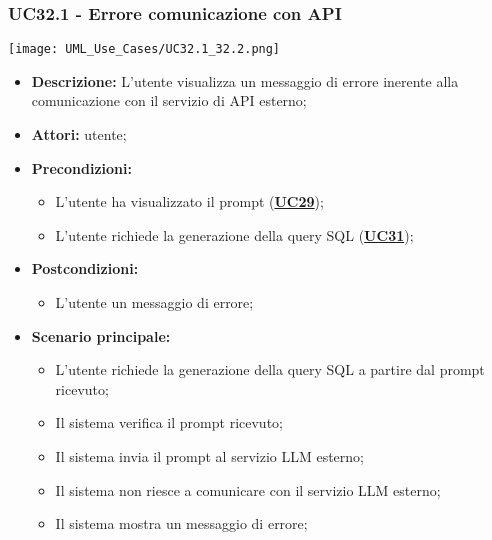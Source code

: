 \subsubsection{UC32.1 - Errore comunicazione con API}
\label{sec:UC32.1}
\texttt{[image: UML\_Use\_Cases/UC32.1\_32.2.png]}
\begin{itemize}
	\item \textbf{Descrizione:} L'utente visualizza un messaggio di errore inerente alla comunicazione con il servizio di API esterno;
	\item \textbf{Attori:} utente;
	\item \textbf{Precondizioni:} 
	\begin{itemize}
		\item L'utente ha visualizzato il prompt (\hyperref[sec:UC29]{\textbf{UC29}});
		\item L'utente richiede la generazione della query SQL (\hyperref[sec:UC31]{\textbf{UC31}});
	\end{itemize}
	\item \textbf{Postcondizioni:} 
	\begin{itemize}
		\item L'utente un messaggio di errore;
	\end{itemize}
	\item \textbf{Scenario principale:}
	\begin{itemize}
		\item L'utente richiede la generazione della query SQL a partire dal prompt ricevuto;
		\item Il sistema verifica il prompt ricevuto;
		\item Il sistema invia il prompt al servizio LLM esterno;
		\item Il sistema non riesce a comunicare con il servizio LLM esterno;
		\item Il sistema mostra un messaggio di errore;
	\end{itemize}
\end{itemize}

